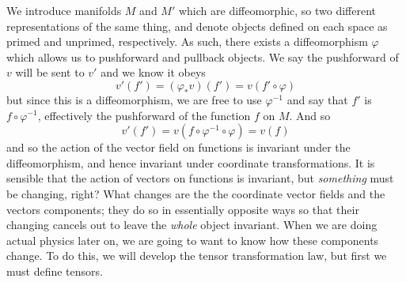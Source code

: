   We introduce manifolds $M$ and $M'$ which are diffeomorphic, so two different representations of the same thing, and denote objects defined on each space as primed and unprimed, respectively.  As such, there exists a diffeomorphism $\varphi$ which allows us to pushforward and pullback objects.  We say the pushforward of $v$  will be sent to $v'$ and we know it obeys
  \begin{equation*}
  	v'(f') = (\varphi_* v)(f') = v(f'\circ \varphi)
  \end{equation*} 
  but since this is a diffeomorphism, we are free to use $\varphi^{-1}$ and say that $f'$ is $f\circ \varphi^{-1}$, effectively the pushforward of the function $f$ on $M$. And so
  \begin{equation*}
  	v'(f') = v(f\circ \varphi^{-1}\circ \varphi) = v(f)
  \end{equation*}
  and so the action of the vector field on functions is invariant under the diffeomorphism, and hence invariant under coordinate transformations.  It is sensible that the action of vectors on functions is invariant, but \textit{something} must be changing, right?  What changes are the the coordinate vector fields and the vectors components; they do so in essentially opposite ways so that their changing cancels out to leave the \textit{whole} object invariant.  When we are doing actual physics later on, we are going to want to know how these components change.  To do this, we will develop the tensor transformation law, but first we must define tensors.
  
